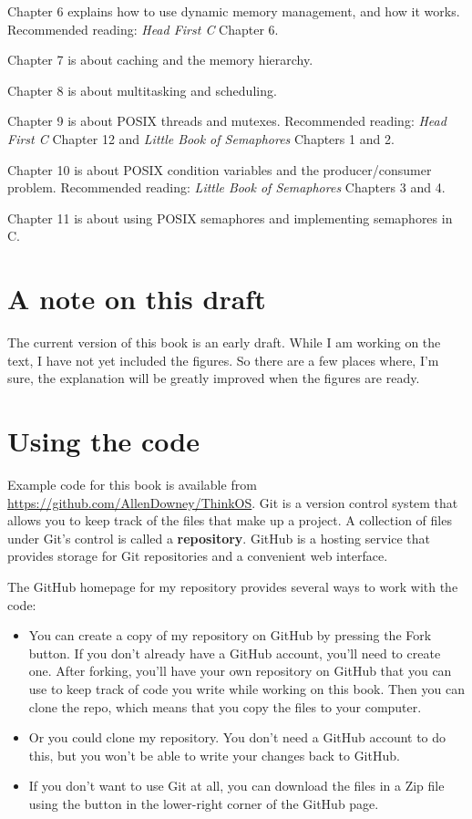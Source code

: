 \documentclass[12pt]{book}
\begin{document}
Chapter 6 explains how to use dynamic memory management, and how
it works.
Recommended reading: {\it Head First C} Chapter 6.

Chapter 7 is about caching and the memory hierarchy.

Chapter 8 is about multitasking and scheduling.

Chapter 9 is about POSIX threads and mutexes.
Recommended reading: {\it Head First C} Chapter 12 and
{\it Little Book of Semaphores} Chapters 1 and 2.

Chapter 10 is about POSIX condition variables and the producer/consumer
problem. Recommended reading: {\it Little Book of Semaphores} Chapters 3
and 4.

Chapter 11 is about using POSIX semaphores and implementing semaphores in C.

\section*{A note on this draft}

The current version of this book is an early draft.  While I am
working on the text, I have not yet included the figures.  So
there are a few places where, I'm sure, the explanation will be
greatly improved when the figures are ready.


\section{Using the code}
\label{code}

Example code for this book is available from
\url{https://github.com/AllenDowney/ThinkOS}.  Git is a version
control system that allows you to keep track of the files that
make up a project.  A collection of files under Git's control is
called a {\bf repository}.  GitHub is a hosting service that provides
storage for Git repositories and a convenient web interface.

The GitHub homepage for my repository provides several ways to
work with the code:

\begin{itemize}

\item You can create a copy of my repository
on GitHub by pressing the {\sf Fork} button.  If you don't already
have a GitHub account, you'll need to create one.  After forking, you'll
have your own repository on GitHub that you can use to keep track
of code you write while working on this book.  Then you can
clone the repo, which means that you copy the files
to your computer.

\item Or you could clone
my repository.  You don't need a GitHub account to do this, but you
won't be able to write your changes back to GitHub.

\item If you don't want to use Git at all, you can download the files
in a Zip file using the button in the lower-right corner of the
GitHub page.

\end{itemize}
\end{document}
